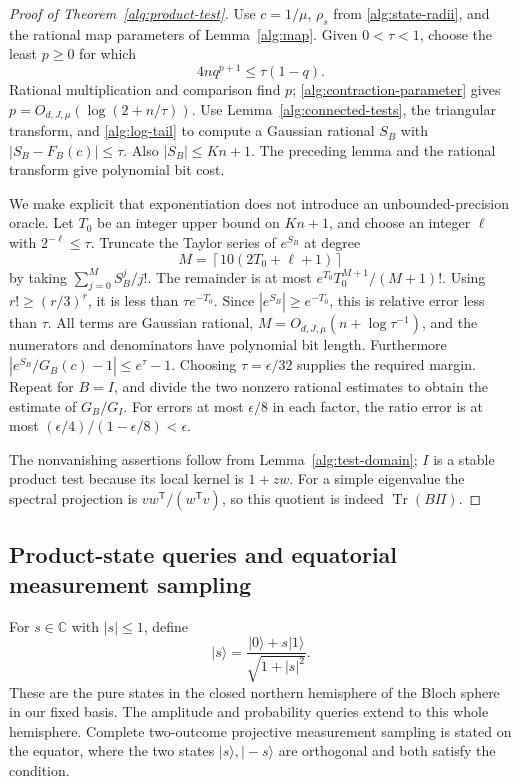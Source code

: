 \documentclass[reqno]{amsart}
\theoremstyle{definition}
\theoremstyle{remark}
\newcommand{\C}{\mathbb C}
\DeclareMathOperator{\Tr}{Tr}
\begin{document}
\begin{proof}[Proof of Theorem~\ref{alg:product-test}]
Use \(c=1/\mu\), \(\rho_s\) from \eqref{alg:state-radii}, and the
rational map parameters of Lemma~\ref{alg:map}.
Given \(0<\tau<1\), choose the least \(p\ge0\) for which
\[
 4nq^{p+1}\le\tau(1-q).
\]
Rational multiplication and comparison find \(p\);
\eqref{alg:contraction-parameter} gives
\(p=O_{d,J,\mu}(\log(2+n/\tau))\).
Use Lemma~\ref{alg:connected-tests}, the triangular transform,
and \eqref{alg:log-tail} to compute a Gaussian rational \(S_B\)
with \(|S_B-F_B(c)|\le\tau\).  Also
\(|S_B|\le Kn+1\).  The preceding lemma and the rational
transform give polynomial bit cost.

We make explicit that exponentiation does not introduce an
unbounded-precision oracle.  Let \(T_0\) be an integer upper
bound on \(Kn+1\), and choose an integer \(\ell\) with
\(2^{-\ell}\le\tau\).
Truncate the Taylor series of \(e^{S_B}\) at degree
\[
 M=\left\lceil10(2T_0+\ell+1)\right\rceil
\]
by taking \(\sum_{j=0}^{M}S_B^j/j!\).  The remainder is at most
\(e^{T_0}T_0^{M+1}/(M+1)!\).
Using \(r!\ge(r/3)^r\), it is less than
\(\tau e^{-T_0}\).
Since \(|e^{S_B}|\ge e^{-T_0}\), this is relative error
less than \(\tau\).  All terms are Gaussian rational,
\(M=O_{d,J,\mu}(n+\log\tau^{-1})\), and the numerators and
denominators have polynomial bit length.
Furthermore
\(|e^{S_B}/G_B(c)-1|\le e^\tau-1\).
Choosing \(\tau=\epsilon/32\) supplies the required margin.
Repeat for \(B=I\), and divide the two nonzero rational
estimates to obtain the estimate of \(G_B/G_I\).
For errors at most \(\epsilon/8\) in each factor, the ratio
error is at most
\((\epsilon/4)/(1-\epsilon/8)<\epsilon\).

The nonvanishing assertions follow from
Lemma~\ref{alg:test-domain}; \(I\) is a stable product test
because its local kernel is \(1+zw\).
For a simple eigenvalue the spectral projection is
\(vw^{\mathsf T}/(w^{\mathsf T}v)\), so this quotient is
indeed \(\Tr(B\Pi)\).
\end{proof}

\subsection{Product-state queries and equatorial measurement sampling}
\label{alg:measurements-subsection}

For \(s\in\C\) with \(|s|\le1\), define
\[
 |s\rangle=\frac{|0\rangle+s|1\rangle}{\sqrt{1+|s|^2}} .
\]
These are the pure states in the closed northern hemisphere
of the Bloch sphere in our fixed basis.  The amplitude and
probability queries extend to this whole hemisphere.  Complete
two-outcome projective measurement sampling is stated on the
equator, where the two states \(|s\rangle,|-s\rangle\) are
orthogonal and both satisfy the condition.
\end{document}
